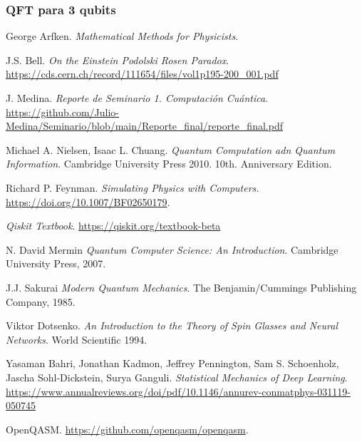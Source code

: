 \documentclass[a4paper]{article}
\begin{document}
\subsubsection{QFT para 3 qubits}
\begin{thebibliography}{99}
 George Arfken. \textit{Mathematical Methods for Physicists}.

 J.S. Bell. \textit{On the Einstein Podolski Rosen Paradox}. \url{https://cds.cern.ch/record/111654/files/vol1p195-200_001.pdf}

 J. Medina. \textit{Reporte de Seminario 1. Computación Cuántica}. \url{https://github.com/Julio-Medina/Seminario/blob/main/Reporte_final/reporte_final.pdf}

 Michael A. Nielsen, Isaac L. Chuang. \textit{Quantum Computation adn Quantum Information}. Cambridge University Press 2010. 10th. Anniversary Edition.

 Richard P. Feynman. \textit{Simulating Physics with Computers.} \url{https://doi.org/10.1007/BF02650179}.

 \textit{Qiskit Textbook}. \url{https://qiskit.org/textbook-beta}

 N. David Mermin \textit{Quantum Computer Science: An Introduction}. Cambridge University Press, 2007.

 J.J. Sakurai \textit{Modern Quantum Mechanics}. The Benjamin/Cummings Publishing Company, 1985.

 Viktor Dotsenko. \textit{An Introduction to the Theory of Spin Glasses and Neural Networks}. World Scientific 1994.

 Yasaman Bahri, Jonathan Kadmon, Jeffrey Pennington, Sam S. Schoenholz, Jascha Sohl-Dickstein, Surya Ganguli. \textit{Statistical Mechanics of Deep Learning}. \url{https://www.annualreviews.org/doi/pdf/10.1146/annurev-conmatphys-031119-050745}

 OpenQASM. \url{https://github.com/openqasm/openqasm}.
 

\end{thebibliography}
\end{document}
